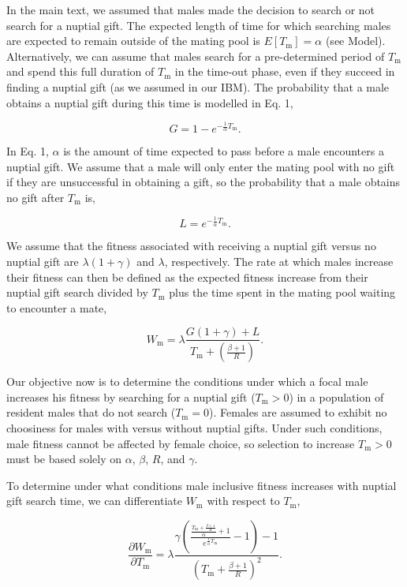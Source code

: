 \documentclass[
]{article}
\begin{document}
In the main text, we assumed that males made the decision to search or
not search for a nuptial gift. The expected length of time for which
searching males are expected to remain outside of the mating pool is
\(E[T_{\mathrm{m}}] = \alpha\) (see Model). Alternatively, we can assume
that males search for a pre-determined period of \(T_{\mathrm{m}}\) and
spend this full duration of \(T_{\mathrm{m}}\) in the time-out phase,
even if they succeed in finding a nuptial gift (as we assumed in our
IBM). The probability that a male obtains a nuptial gift during this
time is modelled in Eq. 1,

\[G = 1 - e^{-\frac{1}{\alpha}T_{\mathrm{m}}}.\]

In Eq. 1, \(\alpha\) is the amount of time expected to pass before a
male encounters a nuptial gift. We assume that a male will only enter
the mating pool with no gift if they are unsuccessful in obtaining a
gift, so the probability that a male obtains no gift after
\(T_{\mathrm{m}}\) is,

\[L = e^{-\frac{1}{\alpha}T_{\mathrm{m}}}.\]

We assume that the fitness associated with receiving a nuptial gift
versus no nuptial gift are \(\lambda(1 + \gamma)\) and \(\lambda\),
respectively. The rate at which males increase their fitness can then be
defined as the expected fitness increase from their nuptial gift search
divided by \(T_{\mathrm{m}}\) plus the time spent in the mating pool
waiting to encounter a mate,

\[W_{\mathrm{m}} = \lambda \frac{G\left(1 + \gamma\right) + L}{T_{\mathrm{m}} + \left( \frac{\beta + 1}{R} \right)}.\]

Our objective now is to determine the conditions under which a focal
male increases his fitness by searching for a nuptial gift
(\(T_{\mathrm{m}}>0\)) in a population of resident males that do not
search (\(T_{\mathrm{m}}=0\)). Females are assumed to exhibit no
choosiness for males with versus without nuptial gifts. Under such
conditions, male fitness cannot be affected by female choice, so
selection to increase \(T_{\mathrm{m}}>0\) must be based solely on
\(\alpha\), \(\beta\), \(R\), and \(\gamma\).

To determine under what conditions male inclusive fitness increases with
nuptial gift search time, we can differentiate \(W_{\mathrm{m}}\) with
respect to \(T_{\mathrm{m}}\),

\[\frac{\partial W_{\mathrm{m}}}{\partial T_{\mathrm{m}}} = \lambda\frac{\gamma\left(\frac{\frac{T_{\mathrm{m}} + \frac{\beta + 1}{R}}{\alpha} + 1}{e^{\frac{1}{\alpha}T_{\mathrm{m}}}} - 1\right) - 1}{\left(T_{\mathrm{m}} + \frac{\beta + 1}{R} \right)^{2}}.\]
\end{document}
